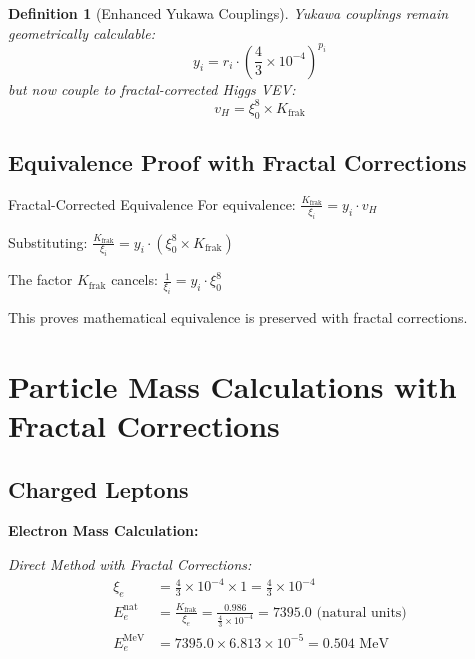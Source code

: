 \documentclass[12pt,a4paper]{article}
\newtheorem{definition}[theorem]{Definition}
\begin{document}
	\begin{definition}[Enhanced Yukawa Couplings]
		Yukawa couplings remain geometrically calculable:
		\begin{equation}
			y_i = r_i \cdot \left(\frac{4}{3} \times 10^{-4}\right)^{p_i}
			\label{eq:yukawa_couplings_enhanced}
		\end{equation}
		but now couple to fractal-corrected Higgs VEV:
		\begin{equation}
			v_H = \xi_0^8 \times K_{\text{frak}}
			\label{eq:higgs_vev_corrected}
		\end{equation}
	\end{definition}
	
	\subsection{Equivalence Proof with Fractal Corrections}
	\label{subsec:equivalence_proof}
	
	\begin{keyresult}{Fractal-Corrected Equivalence}{}
		For equivalence: $\frac{K_{\text{frak}}}{\xi_i} = y_i \cdot v_H$
		
		Substituting: $\frac{K_{\text{frak}}}{\xi_i} = y_i \cdot (\xi_0^8 \times K_{\text{frak}})$
		
		The factor $K_{\text{frak}}$ cancels: $\frac{1}{\xi_i} = y_i \cdot \xi_0^8$
		
		This proves mathematical equivalence is preserved with fractal corrections.
	\end{keyresult}
	

\section{Particle Mass Calculations with Fractal Corrections}
\label{sec:particle_calculations_enhanced}

\subsection{Charged Leptons}
\label{subsec:charged_leptons_enhanced}

\textbf{Electron Mass Calculation:}

\textit{Direct Method with Fractal Corrections:}
\begin{align}
	\xi_e &= \frac{4}{3} \times 10^{-4} \times 1 = \frac{4}{3} \times 10^{-4} \\
	E_{e}^{\text{nat}} &= \frac{K_{\text{frak}}}{\xi_e} = \frac{0.986}{\tfrac{4}{3} \times 10^{-4}} 
	= 7395.0 \text{ (natural units)} \\
	E_e^{\text{MeV}} &= 7395.0 \times 6.813 \times 10^{-5} = 0.504 \text{ MeV}
\end{align}
\end{document}
